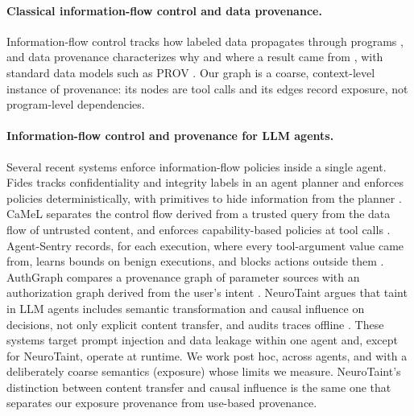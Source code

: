\documentclass[11pt, a4paper]{article}
\theoremstyle{definition}
\begin{document}
\paragraph{Classical information-flow control and data provenance.} Information-flow control tracks how labeled data propagates through programs \citep{denning1976, myers1997}, and data provenance characterizes why and where a result came from \citep{buneman2001}, with standard data models such as PROV \citep{w3c2013prov}. Our graph is a coarse, context-level instance of provenance: its nodes are tool calls and its edges record exposure, not program-level dependencies.

\paragraph{Information-flow control and provenance for LLM agents.} Several recent systems enforce information-flow policies inside a single agent. Fides tracks confidentiality and integrity labels in an agent planner and enforces policies deterministically, with primitives to hide information from the planner \citep{costa2025fides}. CaMeL separates the control flow derived from a trusted query from the data flow of untrusted content, and enforces capability-based policies at tool calls \citep{debenedetti2025camel}. Agent-Sentry records, for each execution, where every tool-argument value came from, learns bounds on benign executions, and blocks actions outside them \citep{sequeira2026agentsentry}. AuthGraph compares a provenance graph of parameter sources with an authorization graph derived from the user's intent \citep{wang2026authgraph}. NeuroTaint argues that taint in LLM agents includes semantic transformation and causal influence on decisions, not only explicit content transfer, and audits traces offline \citep{cai2026neurotaint}. These systems target prompt injection and data leakage within one agent and, except for NeuroTaint, operate at runtime. We work post hoc, across agents, and with a deliberately coarse semantics (exposure) whose limits we measure. NeuroTaint's distinction between content transfer and causal influence is the same one that separates our exposure provenance from use-based provenance.
\end{document}

